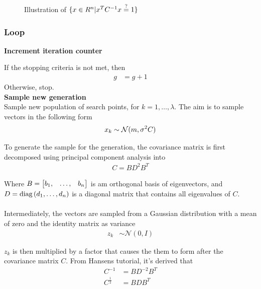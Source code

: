 \begin{figure}[H]
\begin{center}

\end{center}
\begin{center}
\ellipseFigure
\end{center}
\caption{Illustration of $\{x \in R^{n} | x^{T} C^{-1} x \stackrel{?}{=} 1\}$ \label{fig:ellipse}}
\end{figure}

\subsubsection{Loop}

\textbf{Increment iteration counter}

If the stopping criteria is not met, then
\begin{align}
g &= g+1
\end{align}
Otherwise, stop.\\


\textbf{Sample new generation}\\
Sample new population of search points, for $k = 1, \dots, \lambda$.
The aim is to sample vectors in the following form
\begin{align}
x_{k} \sim \mathcal{N}(m, \sigma^2 C)
\end{align}


To generate the sample for the generation, the covariance matrix is first 
decomposed using principal component analysis into
\begin{align}
C = B D^2 B^{T}
\end{align}

Where $B = \begin{bmatrix}
b_1, & \dots, & b_n
\end{bmatrix}$ 
is am orthogonal basis of eigenvectors, and  
$D = \text{diag}\left(d_1, \dots, d_n\right)$
is a diagonal matrix that contains all eigenvalues of $C$.\\
\\
Intermediately, the vectors are sampled from a Gaussian distribution 
with a mean of zero and
the identity matrix as variance
\begin{align}
z_{k} &\sim \mathcal{N}(0, I)
\end{align}

$z_k$ is then multiplied by a factor that causes the them to form 
after the covariance matrix $C$. From Hansens tutorial, it's derived that
\begin{align}
C^{-1} &= B D^{-2} B^{T}\\
C^{\frac{1}{2}} &= B D B^{T}
\end{align}

